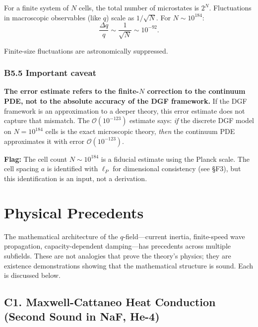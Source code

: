 \documentclass[reprint]{revtex4-2}
\begin{document}
For a finite system of $N$ cells, the total number of microstates is $2^N$. Fluctuations in macroscopic observables (like $q$) scale as $1/\sqrt{N}$. For $N\sim 10^{184}$:
\begin{equation}
\frac{\Delta q}{q} \sim \frac{1}{\sqrt{N}} \sim 10^{-92}.
\end{equation}

Finite-size fluctuations are astronomically suppressed.

\subsubsection{B5.5 Important caveat}

\textbf{The error estimate refers to the finite-$N$ correction to the continuum PDE, not to the absolute accuracy of the DGF framework.} If the DGF framework is an approximation to a deeper theory, this error estimate does not capture that mismatch. The $\mathcal{O}(10^{-123})$ estimate says: \emph{if} the discrete DGF model on $N=10^{184}$ cells is the exact microscopic theory, \emph{then} the continuum PDE approximates it with error $\mathcal{O}(10^{-123})$.

\textbf{Flag:} The cell count $N\sim 10^{184}$ is a fiducial estimate using the Planck scale. The cell spacing $a$ is identified with $\ell_P$ for dimensional consistency (see \S F3), but this identification is an input, not a derivation.

\section{Physical Precedents}

The mathematical architecture of the $q$-field---current inertia, finite-speed wave propagation, capacity-dependent damping---has precedents across multiple subfields. These are not analogies that prove the theory's physics; they are existence demonstrations showing that the mathematical structure is sound. Each is discussed below.

\subsection{C1. Maxwell-Cattaneo Heat Conduction (Second Sound in NaF, He-4)}
\end{document}
